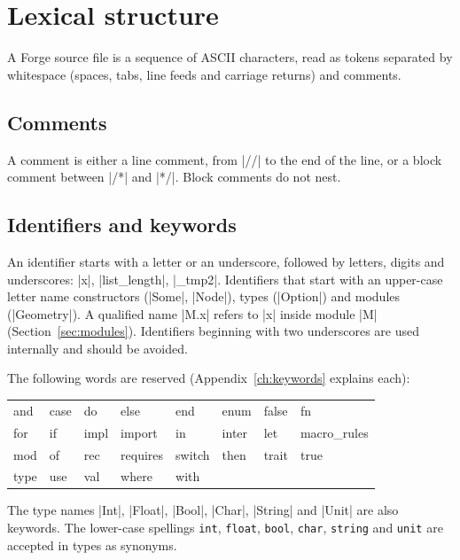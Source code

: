 \chapter{Lexical structure}
\label{ch:lexical}

A Forge source file is a sequence of ASCII characters, read as tokens
separated by whitespace (spaces, tabs, line feeds and carriage returns) and
comments.

\section{Comments}
A comment is either a line comment, from \fc|//| to the end of the line, or
a block comment between \fc|/*| and \fc|*/|. Block comments do not nest.

\section{Identifiers and keywords}
An identifier starts with a letter or an underscore, followed by letters,
digits and underscores: \fc|x|, \fc|list_length|, \fc|_tmp2|. Identifiers that
start with an upper-case letter name constructors (\fc|Some|, \fc|Node|),
types (\fc|Option|) and modules (\fc|Geometry|). A qualified name
\fc|M.x| refers to \fc|x| inside module \fc|M| (Section~\ref{sec:modules}).
Identifiers beginning with two underscores are used internally and should be
avoided.

The following words are reserved (Appendix~\ref{ch:keywords} explains each):

\begin{center}
\small\ttfamily
\begin{tabular}{@{}llllllll@{}}
and & case & do & else & end & enum & false & fn \\
for & if & impl & import & in & inter & let & macro\_rules \\
mod & of & rec & requires & switch & then & trait & true \\
type & use & val & where & with & & & \\
\end{tabular}
\end{center}

\noindent The type names \fc|Int|, \fc|Float|, \fc|Bool|, \fc|Char|,
\fc|String| and \fc|Unit| are also keywords. The lower-case spellings
\texttt{int}, \texttt{float}, \texttt{bool}, \texttt{char}, \texttt{string}
and \texttt{unit} are accepted in types as synonyms.

